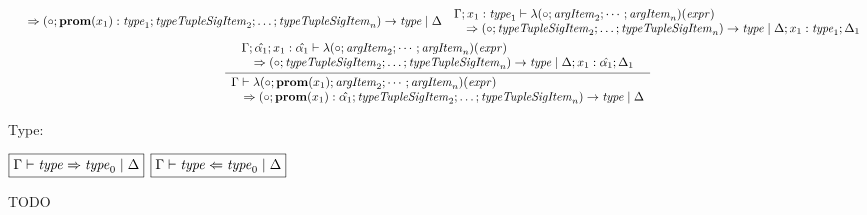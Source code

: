 \begin{gather*}
{\begin{array}{l}
      \hspace{1em}\Rightarrow (\circ; \mathbf{prom}(x_1): \mathit{type}_1; \mathit{typeTupleSigItem}_2; \ldots; \mathit{typeTupleSigItem}_n) \rightarrow \mathit{type} \mid \Delta
    \end{array}
  }{
    \begin{array}{l}
      \Gamma; x_1: \mathit{type}_1 \vdash \lambda(\circ; \mathit{argItem}_2; \cdots; \mathit{argItem}_n)(\mathit{expr})
      \\
      \hspace{1em}\Rightarrow (\circ; \mathit{typeTupleSigItem}_2; \ldots; \mathit{typeTupleSigItem}_n) \rightarrow \mathit{type} \mid \Delta; x_1: \mathit{type}_1; \Delta_1
    \end{array}
  }
  \\
  \infer{
    \begin{array}{l}
      \Gamma \vdash \lambda(\circ; \mathbf{prom}(x_1); \mathit{argItem}_2; \cdots; \mathit{argItem}_n)(\mathit{expr})
      \\
      \hspace{1em}\Rightarrow (\circ; \mathbf{prom}(x_1): \hat{\alpha_1}; \mathit{typeTupleSigItem}_2; \ldots; \mathit{typeTupleSigItem}_n) \rightarrow \mathit{type} \mid \Delta
    \end{array}
  }{
    \begin{array}{l}
      \Gamma; \hat{\alpha_1}; x_1: \hat{\alpha_1} \vdash \lambda(\circ; \mathit{argItem}_2; \cdots; \mathit{argItem}_n)(\mathit{expr})
      \\
      \hspace{1em}\Rightarrow (\circ; \mathit{typeTupleSigItem}_2; \ldots; \mathit{typeTupleSigItem}_n) \rightarrow \mathit{type} \mid \Delta; x_1: \hat{\alpha_1}; \Delta_1
    \end{array}
  }
\end{gather*}

Type:

$\fbox{$\Gamma \vdash \mathit{type} \Rightarrow \mathit{type}_0 \mid \Delta$}$
$\fbox{$\Gamma \vdash \mathit{type} \Leftarrow \mathit{type}_0 \mid \Delta$}$

TODO
